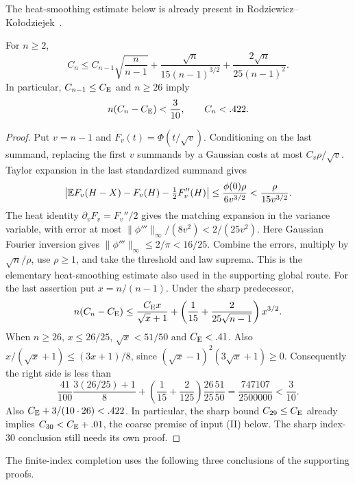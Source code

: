 The heat-smoothing estimate below is already present in
Rodziewicz--Ko\l{}odziejek~\cite[Section~15]{RK2026}.
\begin{lemma}\label{gi:gaussian-entry}
For $n\ge2$,
\[
 C_n\le C_{n-1}\sqrt{\frac n{n-1}}
       +\frac{\sqrt n}{15(n-1)^{3/2}}
       +\frac{2\sqrt n}{25(n-1)^2}.
\]
In particular, $C_{n-1}\le C_{\mathrm E}$ and $n\ge26$ imply
\begin{equation}\label{gi:small-excess}
 n(C_n-C_{\mathrm E})<\frac3{10},\qquad C_n<.422.
\end{equation}
\end{lemma}
\begin{proof}
Put $v=n-1$ and $F_v(t)=\Phi(t/\sqrt v)$. Conditioning on the last
summand, replacing the first $v$ summands by a Gaussian costs at most
$C_v\rho/\sqrt v$. Taylor expansion in the last standardized summand gives
\[
 \left|\mathbb E F_v(H-X)-F_v(H)-\tfrac12F_v''(H)\right|
 \le\frac{\phi(0)\rho}{6v^{3/2}}<\frac{\rho}{15v^{3/2}}.
\]
The heat identity $\partial_vF_v=F_v''/2$ gives the matching expansion
in the variance variable, with error at most
$\|\phi'''\|_\infty/(8v^2)<2/(25v^2)$. Here Gaussian Fourier
inversion gives $\|\phi'''\|_\infty\le2/\pi<16/25$.
Combine the errors, multiply by $\sqrt n/\rho$, use $\rho\ge1$,
and take the threshold and law suprema. This is the elementary
heat-smoothing estimate also used in the supporting global route.
For the last assertion put $x=n/(n-1)$. Under the sharp predecessor,
\[
 n(C_n-C_{\mathrm E})\le\frac{C_{\mathrm E} x}{\sqrt x+1}
       +\left(\frac1{15}+\frac2{25\sqrt{n-1}}\right)x^{3/2}.
\]
When $n\ge26$, $x\le26/25$, $\sqrt x<51/50$ and $C_{\mathrm E}<.41$.
Also $x/(\sqrt x+1)\le(3x+1)/8$, since
$(\sqrt x-1)^2(3\sqrt x+1)\ge0$. Consequently the right side is less than
\[
 \frac{41}{100}\frac{3(26/25)+1}{8}
 +\left(\frac1{15}+\frac2{125}\right)\frac{26}{25}\frac{51}{50}
 =\frac{747107}{2500000}<\frac3{10}.
\]
Also $C_{\mathrm E}+3/(10\cdot26)<.422$.
In particular, the sharp bound $C_{29}\le C_{\mathrm E}$ already implies
$C_{30}<C_{\mathrm E}+.01$, the coarse premise of input (II)
below. The sharp index-$30$ conclusion still needs its own proof.
\end{proof}

The finite-index completion uses the following three conclusions of the
supporting proofs.

